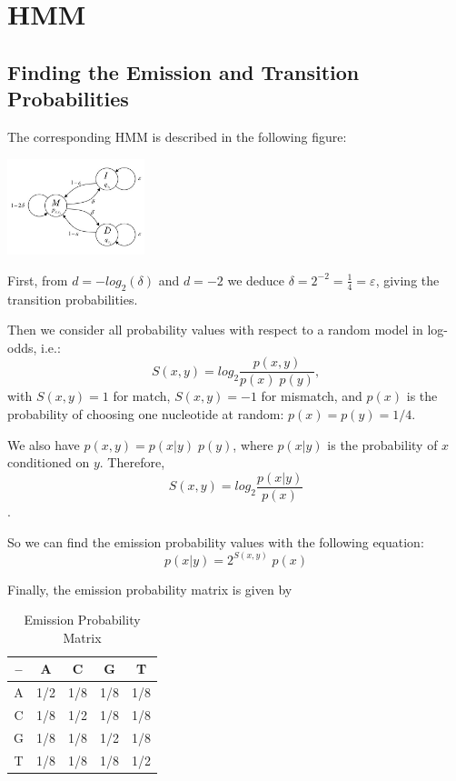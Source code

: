 \documentclass[english, a4paper,11pt]{article}
\begin{document}
\section{HMM}

\subsection{Finding the Emission and Transition Probabilities}
The corresponding HMM is described in the following figure:


\begin{centering}
\includegraphics[width=0.3\textwidth]{HMM.jpg}

\end{centering}


First, from $d = -log_2(\delta)$ and $d = -2$ we deduce $\delta = 2^{-2} = \frac{1}{4} = \varepsilon$, 
giving the transition probabilities.

Then we consider all probability values with respect to a random model in log-odds, i.e.:
$$S(x,y)=log_2\frac{p(x,y)}{p(x)\; p(y)},$$
with $S(x,y)=1$ for match, $S(x,y)=-1$ for mismatch, 
and $p(x)$ is the probability of choosing one nucleotide at random: $p(x)=p(y)=1/4$.

We also have $p(x,y)=p(x|y)\;p(y)$, where $p(x|y)$ is the probability of $x$ conditioned on $y$. Therefore,
$$S(x,y)=log_2\frac{p(x|y)}{p(x)}$$.

So we can find the emission probability values with the following equation:
$$p(x|y)=2^{S(x,y)}\;p(x)$$

Finally, the emission probability matrix is given by

\begin{table}[ht]
\caption{Emission Probability Matrix}
\centering 
\begin{tabular}{c|c|c|c|c|}
-- & A  & C & G & T \\
\hline
A & 1/2 & 1/8 & 1/8 & 1/8 \\
\hline
C & 1/8  & 1/2 & 1/8 & 1/8 \\
\hline
G & 1/8 & 1/8 & 1/2 & 1/8 \\
\hline
T & 1/8 & 1/8 & 1/8 & 1/2 \\ \hline

\end{tabular}
\label{table:nonlin}
\end{table}
\end{document}
